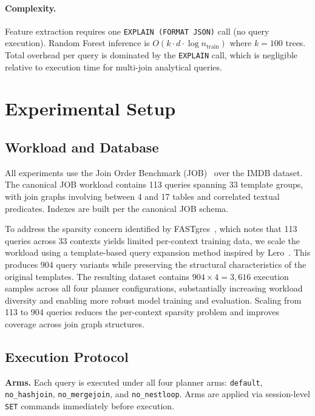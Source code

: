\documentclass[sigconf,natbib=false]{article}
\newcommand{\arm}[1]{\texttt{#1}}
\begin{document}
\paragraph{Complexity.} Feature extraction requires one \texttt{EXPLAIN (FORMAT JSON)} call
(no query execution). Random Forest inference is $O(k \cdot d \cdot \log n_{\mathrm{train}})$
where $k=100$ trees. Total overhead per query is dominated by the \texttt{EXPLAIN} call, which
is negligible relative to execution time for multi-join analytical queries.

\section{Experimental Setup}
\label{sec:setup}

\subsection{Workload and Database}

All experiments use the Join Order Benchmark (JOB)~\cite{Leis2015} over the IMDB dataset.
The canonical JOB workload contains 113 queries spanning 33 template groups, with join graphs
involving between 4 and 17 tables and correlated textual predicates. Indexes are built per
the canonical JOB schema.

To address the sparsity concern identified by FASTgres~\cite{Habich2023}, which notes that
113 queries across 33 contexts yields limited per-context training data, we scale the workload
using a template-based query expansion method inspired by Lero~\cite{Zhu2023Lero}. This
produces 904 query variants while preserving the structural characteristics of the original
templates. The resulting dataset contains $904 \times 4 = 3{,}616$ execution samples across
all four planner configurations, substantially increasing workload diversity and enabling
more robust model training and evaluation. Scaling from 113 to 904 queries reduces the
per-context sparsity problem and improves coverage across join graph structures.

\subsection{Execution Protocol}

\textbf{Arms.} Each query is executed under all four planner arms: \arm{default},
\arm{no\_hashjoin}, \arm{no\_mergejoin}, and \arm{no\_nestloop}. Arms are applied via
session-level \texttt{SET} commands immediately before execution.
\end{document}
